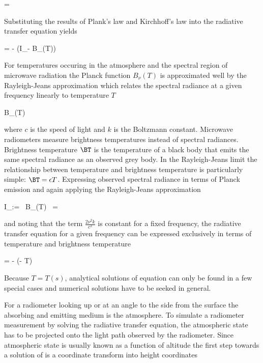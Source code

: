      \le \ABSCOEF = \epsilon {}
    \stopformula

    Substituting the results of Plank's law and Kirchhoff's law into the
    radiative transfer equation  yields

    \startformula
         = - \ABSCOEF(I_\nu - B_\nu(T)) \EQSTOP
    \stopformula

    For temperatures occuring in the atmosphere and the spectral region of
    microwave radiation the Planck function $B_\nu (T)$ is approximated
    well by the Rayleigh-Jeans approximation which relates the spectral
    radiance at a given frequency linearly to temperature $T$

    \startformula
        B_\nu(T) \approx {}
    \stopformula

    where $c$ is the speed of light and $k$ is the Boltzmann constant.
    Microwave radiometers measure brightness temperatures instead of spectral
    radiances. Brightness temperature $\BT$ is the temperature of a black body
    that emits the same spectral radiance as an observed grey body. In the
    Rayleigh-Jeans limit the relationship between temperature and brightness
    temperature is particularly simple: $\BT = \epsilon T$. Expressing
    observed spectral radiance in terms of Planck emission and again
    applying the Rayleigh-Jeans approximation

    \startformula
        I_\nu := \epsilon \, B_\nu(T)
            \approx \epsilon \, 
            =  \, \BT \EQCOMMA
    \stopformula

    and noting that the term $\frac{2 \nu^2 k}{c^2}$ is constant for a
    fixed frequency, the radiative transfer equation  for
    a given frequency can be expressed exclusively in terms of temperature and
    brightness temperature

    \startformula
         = - \ABSCOEF (\BT - T) \EQSTOP
    \stopformula

    Because $T = T(s)$, analytical solutions of equation 
    can only be found in a few special cases and numerical solutions have to
    be seeked in general.

\stopsection


\startsection[title={A Solution for Ground-based Radiometer Applications}]

    For a radiometer looking up or at an angle to the side from the surface the
    absorbing and emitting medium is the atmosphere. To simulate a radiometer
    measurement by solving the radiative transfer equation, the atmospheric
    state has to be projected onto the light path observed by the radiometer.
    Since atmospheric state is usually known as a function of altitude the
    first step towards a solution of  is a coordinate
    transform into height coordinates

